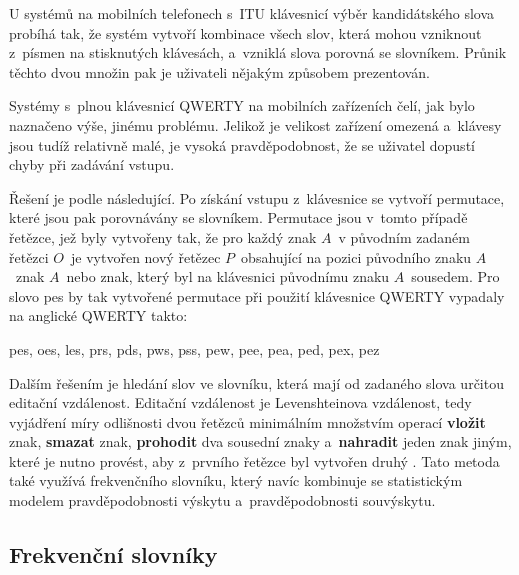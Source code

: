 \documentclass[a4paper,11pt,openany]{book} %
\newcommand\exmp{\textsf}
\begin{document}
U systémů na mobilních telefonech s~ITU klávesnicí výběr kandidátského slova probíhá tak, že systém vytvoří kombinace všech slov, která mohou vzniknout z~písmen na stisknutých klávesách, a~vzniklá slova porovná se slovníkem. Průnik těchto dvou množin pak je uživateli nějakým způsobem prezentován. 

Systémy s~plnou klávesnicí QWERTY na mobilních zařízeních čelí, jak bylo naznačeno výše, jinému problému. Jelikož je velikost zařízení omezená a~klávesy jsou tudíž relativně malé, je vysoká pravděpodobnost, že se uživatel dopustí chyby při zadávání vstupu. \parencite{kocienda2012method} %

Řešení je podle \textcite{kocienda2012method} následující. Po získání vstupu z~klávesnice se vytvoří permutace, které jsou pak porovnávány se slovníkem. Permutace jsou v~tomto případě řetězce, jež byly vytvořeny tak, že pro každý znak $A$~v původním zadaném řetězci $O$~je vytvořen nový řetězec $P$~obsahující na pozici původního znaku $A$~znak $A$~nebo znak, který byl na klávesnici původnímu znaku $A$~sousedem. Pro slovo \exmp{pes} by tak vytvořené permutace při použití klávesnice QWERTY vypadaly na anglické QWERTY takto: %

\begin{center} 
	\exmp{pes, oes, les, prs, pds, pws, pss, pew, pee, pea, ped, pex, pez}
\end{center}

Dalším řešením je hledání slov ve slovníku, která mají od zadaného slova určitou editační vzdálenost. Editační vzdálenost je Levenshteinova vzdálenost, tedy vyjádření míry odlišnosti dvou řetězců minimálním množstvím operací {\bf vložit} znak, {\bf smazat} znak, {\bf prohodit} dva sousední znaky a~{\bf nahradit} jeden znak jiným, které je nutno provést, aby z~prvního řetězce byl vytvořen druhý \parencite{levenshtein-en1966}. \nocite{levenshtein1965}  %
Tato metoda také využívá frekvenčního slovníku, který navíc kombinuje se statistickým modelem pravděpodobnosti výskytu a~pravděpodobnosti souvýskytu. \parencite{peternorvig} %

\subsection{Frekvenční slovníky}\label{frecdic}
\end{document}
